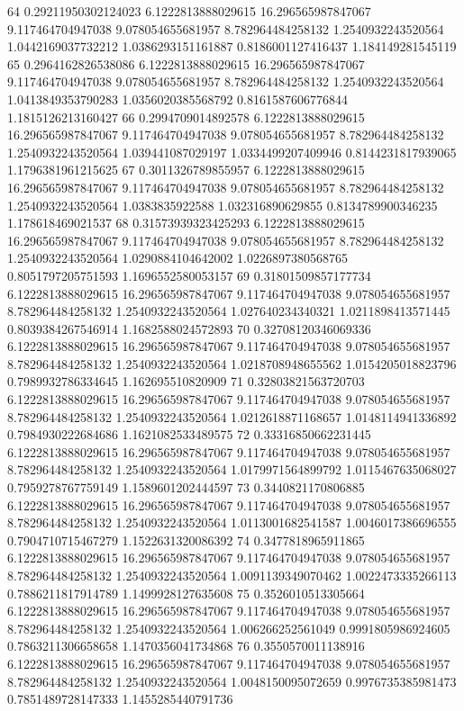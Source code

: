 {64 0.29211950302124023 6.1222813888029615 16.296565987847067 9.117464704947038 9.078054655681957 8.782964484258132 1.2540932243520564 1.0442169037732212 1.0386293151161887 0.8186001127416437 1.184149281545119
65 0.2964162826538086 6.1222813888029615 16.296565987847067 9.117464704947038 9.078054655681957 8.782964484258132 1.2540932243520564 1.0413849353790283 1.0356020385568792 0.8161587606776844 1.1815126213160427
66 0.2994709014892578 6.1222813888029615 16.296565987847067 9.117464704947038 9.078054655681957 8.782964484258132 1.2540932243520564 1.039441087029197 1.0334499207409946 0.8144231817939065 1.1796381961215625
67 0.3011326789855957 6.1222813888029615 16.296565987847067 9.117464704947038 9.078054655681957 8.782964484258132 1.2540932243520564 1.0383835922588 1.032316890629855 0.8134789900346235 1.178618469021537
68 0.31573939323425293 6.1222813888029615 16.296565987847067 9.117464704947038 9.078054655681957 8.782964484258132 1.2540932243520564 1.0290884104642002 1.0226897380568765 0.8051797205751593 1.1696552580053157
69 0.31801509857177734 6.1222813888029615 16.296565987847067 9.117464704947038 9.078054655681957 8.782964484258132 1.2540932243520564 1.027640234340321 1.0211898413571445 0.8039384267546914 1.1682588024572893
70 0.32708120346069336 6.1222813888029615 16.296565987847067 9.117464704947038 9.078054655681957 8.782964484258132 1.2540932243520564 1.0218708948655562 1.0154205018823796 0.7989932786334645 1.162695510820909
71 0.32803821563720703 6.1222813888029615 16.296565987847067 9.117464704947038 9.078054655681957 8.782964484258132 1.2540932243520564 1.0212618871168657 1.0148114941336892 0.7984930222684686 1.1621082533489575
72 0.33316850662231445 6.1222813888029615 16.296565987847067 9.117464704947038 9.078054655681957 8.782964484258132 1.2540932243520564 1.0179971564899792 1.0115467635068027 0.7959278767759149 1.1589601202444597
73 0.3440821170806885 6.1222813888029615 16.296565987847067 9.117464704947038 9.078054655681957 8.782964484258132 1.2540932243520564 1.0113001682541587 1.0046017386696555 0.7904710715467279 1.1522631320086392
74 0.3477818965911865 6.1222813888029615 16.296565987847067 9.117464704947038 9.078054655681957 8.782964484258132 1.2540932243520564 1.0091139349070462 1.0022473335266113 0.7886211817914789 1.1499928127635608
75 0.3526010513305664 6.1222813888029615 16.296565987847067 9.117464704947038 9.078054655681957 8.782964484258132 1.2540932243520564 1.006266252561049 0.9991805986924605 0.7863211306658658 1.1470356041734868
76 0.3550570011138916 6.1222813888029615 16.296565987847067 9.117464704947038 9.078054655681957 8.782964484258132 1.2540932243520564 1.0048150095072659 0.9976735385981473 0.7851489728147333 1.1455285440791736
}
